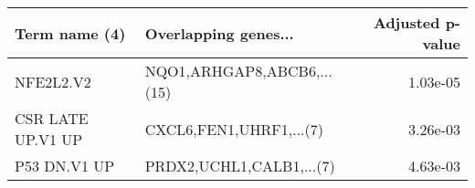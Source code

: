 \begin{tabular}{llr}
\toprule
    Term name (4) &       Overlapping genes... &  Adjusted p-value \\
\midrule
        NFE2L2.V2 & NQO1,ARHGAP8,ABCB6,...(15) &          1.03e-05 \\
CSR LATE UP.V1 UP &    CXCL6,FEN1,UHRF1,...(7) &          3.26e-03 \\
     P53 DN.V1 UP &   PRDX2,UCHL1,CALB1,...(7) &          4.63e-03 \\
\bottomrule
\end{tabular}
